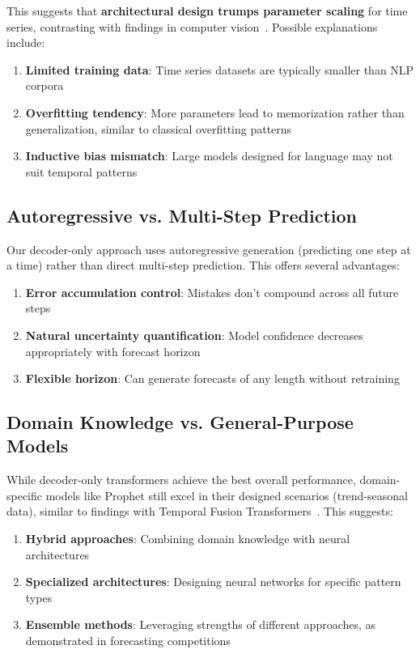 \documentclass[11pt]{article}
\begin{document}
This suggests that \textbf{architectural design trumps parameter scaling} for time series, contrasting with findings in computer vision~\cite{he2016deep}. Possible explanations include:

\begin{enumerate}
\item \textbf{Limited training data}: Time series datasets are typically smaller than NLP corpora
\item \textbf{Overfitting tendency}: More parameters lead to memorization rather than generalization, similar to classical overfitting patterns~\cite{srivastava2014dropout}
\item \textbf{Inductive bias mismatch}: Large models designed for language may not suit temporal patterns
\end{enumerate}

\subsection{Autoregressive vs. Multi-Step Prediction}

Our decoder-only approach uses autoregressive generation (predicting one step at a time) rather than direct multi-step prediction. This offers several advantages:

\begin{enumerate}
\item \textbf{Error accumulation control}: Mistakes don't compound across all future steps
\item \textbf{Natural uncertainty quantification}: Model confidence decreases appropriately with forecast horizon
\item \textbf{Flexible horizon}: Can generate forecasts of any length without retraining
\end{enumerate}

\subsection{Domain Knowledge vs. General-Purpose Models}

While decoder-only transformers achieve the best overall performance, domain-specific models like Prophet still excel in their designed scenarios (trend-seasonal data), similar to findings with Temporal Fusion Transformers~\cite{lim2021temporal}. This suggests:

\begin{enumerate}
\item \textbf{Hybrid approaches}: Combining domain knowledge with neural architectures
\item \textbf{Specialized architectures}: Designing neural networks for specific pattern types
\item \textbf{Ensemble methods}: Leveraging strengths of different approaches, as demonstrated in forecasting competitions~\cite{makridakis2020m4}
\end{enumerate}
\end{document}
